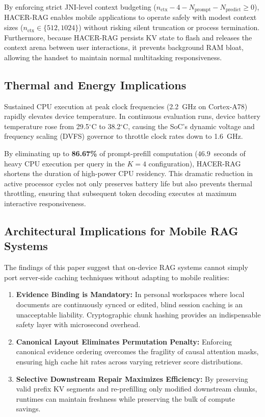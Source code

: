 By enforcing strict JNI-level context budgeting ($n_{\text{ctx}} - 4 - N_{\text{prompt}} - N_{\text{predict}} \ge 0$), HACER-RAG enables mobile applications to operate safely with modest context sizes ($n_{\text{ctx}} \in \{512, 1024\}$) without risking silent truncation or process termination. Furthermore, because HACER-RAG persists KV state to flash and releases the context arena between user interactions, it prevents background RAM bloat, allowing the handset to maintain normal multitasking responsiveness.

\subsection{Thermal and Energy Implications}
Sustained CPU execution at peak clock frequencies (2.2~GHz on Cortex-A78) rapidly elevates device temperature. In continuous evaluation runs, device battery temperature rose from 29.5$^\circ$C to 38.2$^\circ$C, causing the SoC's dynamic voltage and frequency scaling (DVFS) governor to throttle clock rates down to 1.6~GHz.

By eliminating up to \textbf{86.67\%} of prompt-prefill computation ($46.9$~seconds of heavy CPU execution per query in the $K=4$ configuration), HACER-RAG shortens the duration of high-power CPU residency. This dramatic reduction in active processor cycles not only preserves battery life but also prevents thermal throttling, ensuring that subsequent token decoding executes at maximum interactive responsiveness.

\subsection{Architectural Implications for Mobile RAG Systems}
The findings of this paper suggest that on-device RAG systems cannot simply port server-side caching techniques without adapting to mobile realities:
\begin{enumerate}
    \item \textbf{Evidence Binding is Mandatory:} In personal workspaces where local documents are continuously synced or edited, blind session caching is an unacceptable liability. Cryptographic chunk hashing provides an indispensable safety layer with microsecond overhead.
    \item \textbf{Canonical Layout Eliminates Permutation Penalty:} Enforcing canonical evidence ordering overcomes the fragility of causal attention masks, ensuring high cache hit rates across varying retriever score distributions.
    \item \textbf{Selective Downstream Repair Maximizes Efficiency:} By preserving valid prefix KV segments and re-prefilling only modified downstream chunks, runtimes can maintain freshness while preserving the bulk of compute savings.
\end{enumerate}
